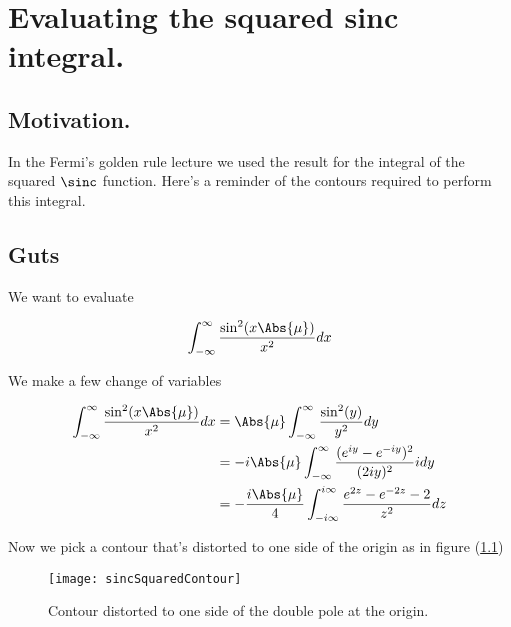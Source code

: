 
%

\chapter{Evaluating the squared sinc integral.}
\label{chap:sincIntegral}
{}
\date{Dec 10, 2011}

\beginArtWithToc

\section{Motivation.}

In the Fermi's golden rule lecture we used the result for the integral of the squared $\sinc$ function.  Here's a reminder of the contours required to perform this integral.

\section{Guts}

We want to evaluate

\begin{equation}\label{eqn:sincIntegral:10}
\int_{-\infty}^\infty \frac{\sin^2 (x\Abs{\mu})}{x^2} dx
\end{equation}

We make a few change of variables

\begin{align*}
\int_{-\infty}^\infty \frac{\sin^2 (x\Abs{\mu})}{x^2} dx
&=
\Abs{\mu} \int_{-\infty}^\infty \frac{\sin^2 (y)}{y^2} dy \\
&=
-i \Abs{\mu} \int_{-\infty}^\infty \frac{(e^{iy} - e^{-iy})^2}{(2 i y)^2} i dy \\
&=
-\frac{i \Abs{\mu}}{4} \int_{-i\infty}^{i\infty} \frac{e^{2z} - e^{-2z} - 2}{z^2} dz
\end{align*}

Now we pick a contour that's distorted to one side of the origin as in figure (\ref{fig:sincIntegral:sincSquaredContour})
\begin{figure}[htp]
   \centering
   \texttt{[image: sincSquaredContour]}
   \caption{Contour distorted to one side of the double pole at the origin.}\label{fig:sincIntegral:sincSquaredContour}
\end{figure}

